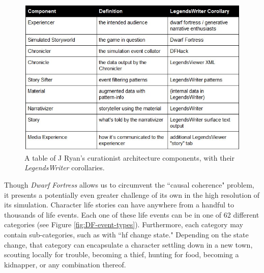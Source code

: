\begin{figure}
    \centering
    \includegraphics[width=\textwidth]{figures/4-Delve/curationist-legendswriter.jpg}
    \caption{A table of J Ryan's curationist architecture components, with their \textit{LegendsWriter} corollaries.}
    \label{fig:curationist-legendsviewer}
\end{figure}


Though \textit{Dwarf Fortress} allows us to circumvent the ``causal coherence" problem, it presents a potentially even greater challenge of its own in the high resolution of its simulation. Character life stories can have anywhere from a handful to thousands of life events. Each one of these life events can be in one of 62 different categories (see Figure \ref{fig:DF-event-types}). Furthermore, each category may contain sub-categories, such as with ``hf change state." Depending on the state change, that category can encapsulate a character settling down in a new town, scouting locally for trouble, becoming a thief, hunting for food, becoming a kidnapper, or any combination thereof.


